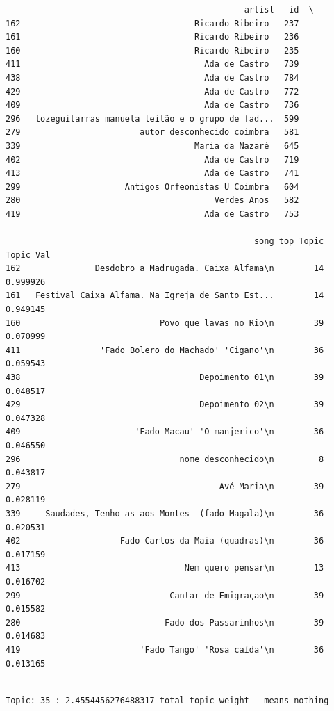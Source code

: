 \documentclass[11pt]{article}
\begin{document}
    
    \begin{verbatim}
                                                artist   id  \
162                                   Ricardo Ribeiro   237   
161                                   Ricardo Ribeiro   236   
160                                   Ricardo Ribeiro   235   
411                                     Ada de Castro   739   
438                                     Ada de Castro   784   
429                                     Ada de Castro   772   
409                                     Ada de Castro   736   
296   tozeguitarras manuela leitão e o grupo de fad...  599   
279                        autor desconhecido coimbra   581   
339                                   Maria da Nazaré   645   
402                                     Ada de Castro   719   
413                                     Ada de Castro   741   
299                     Antigos Orfeonistas U Coimbra   604   
280                                       Verdes Anos   582   
419                                     Ada de Castro   753   

                                                  song top Topic  Topic Val  
162               Desdobro a Madrugada. Caixa Alfama\n        14   0.999926  
161   Festival Caixa Alfama. Na Igreja de Santo Est...        14   0.949145  
160                            Povo que lavas no Rio\n        39   0.070999  
411                'Fado Bolero do Machado' 'Cigano'\n        36   0.059543  
438                                    Depoimento 01\n        39   0.048517  
429                                    Depoimento 02\n        39   0.047328  
409                       'Fado Macau' 'O manjerico'\n        36   0.046550  
296                                nome desconhecido\n         8   0.043817  
279                                        Avé Maria\n        39   0.028119  
339     Saudades, Tenho as aos Montes  (fado Magala)\n        36   0.020531  
402                    Fado Carlos da Maia (quadras)\n        36   0.017159  
413                                 Nem quero pensar\n        13   0.016702  
299                              Cantar de Emigraçao\n        39   0.015582  
280                             Fado dos Passarinhos\n        39   0.014683  
419                        'Fado Tango' 'Rosa caída'\n        36   0.013165  
    \end{verbatim}

    
    \begin{Verbatim}[commandchars=\\\{\}]

Topic: 35 : 2.4554456276488317 total topic weight - means nothing

    \end{Verbatim}
\end{document}
